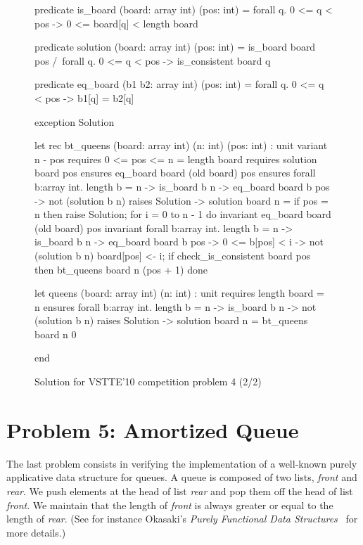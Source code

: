 \begin{figure}
  \centering
\begin{whycode}
  predicate is_board (board: array int) (pos: int) =
    forall q. 0 <= q < pos -> 0 <= board[q] < length board

  predicate solution (board: array int) (pos: int) =
    is_board board pos /\
    forall q. 0 <= q < pos -> is_consistent board q

  predicate eq_board (b1 b2: array int) (pos: int) =
    forall q. 0 <= q < pos -> b1[q] = b2[q]

  exception Solution

  let rec bt_queens (board: array int) (n: int) (pos: int) : unit
    variant  { n - pos }
    requires { 0 <= pos <= n = length board }
    requires { solution board pos }
    ensures  { eq_board board (old board) pos }
    ensures  { forall b:array int. length b = n -> is_board b n ->
                 eq_board board b pos -> not (solution b n) }
    raises   { Solution -> solution board n }
  = if pos = n then raise Solution;
    for i = 0 to n - 1 do
      invariant { eq_board board (old board) pos }
      invariant { forall b:array int. length b = n -> is_board b n ->
        eq_board board b pos -> 0 <= b[pos] < i -> not (solution b n) }
      board[pos] <- i;
      if check_is_consistent board pos then bt_queens board n (pos + 1)
    done

  let queens (board: array int) (n: int) : unit
    requires { length board = n }
    ensures  { forall b:array int.
                 length b = n -> is_board b n -> not (solution b n) }
    raises   { Solution -> solution board n }
  = bt_queens board n 0

end
\end{whycode}
\vspace*{-1em}%
  \caption{Solution for VSTTE'10 competition problem 4 (2/2)}
  \label{fig:NQueens2}
\end{figure}

\section{Problem 5: Amortized Queue}

The last problem consists in verifying the implementation of a
well-known purely applicative data structure for queues.
A queue is composed of two lists, \textit{front} and \textit{rear}.
We push elements at the head of list \textit{rear} and pop them off
the head of list \textit{front}. We maintain that the length of
\textit{front} is always greater or equal to the length of \textit{rear}.
(See for instance Okasaki's \emph{Purely Functional Data
  Structures}~\cite{okasaki98} for more details.)

